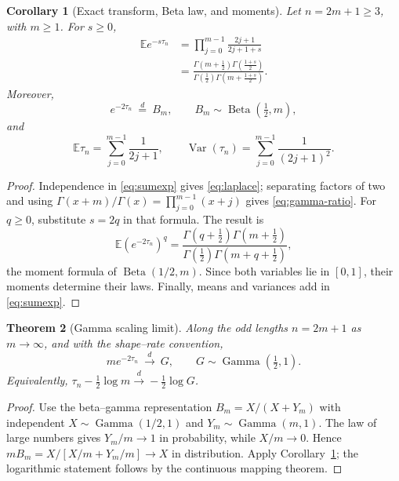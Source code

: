 \documentclass[10pt,a4paper]{amsart}
\newtheorem{theorem}{Theorem}[section]
\newtheorem{corollary}[theorem]{Corollary}
\theoremstyle{remark}
\newcommand{\Beta}{\operatorname{Beta}}
\newcommand{\Gam}{\operatorname{Gamma}}
\newcommand{\1}{\mathbf 1}
\begin{document}
\begin{corollary}[Exact transform, Beta law, and moments]\label{cor:beta}
Let $n=2m+1\geq3$, with $m\geq1$.  For $s\geq0$,
\begin{align}
 \mathbb E e^{-s\tau_n}
 &=\prod_{j=0}^{m-1}\frac{2j+1}{2j+1+s} \label{eq:laplace}\\
 &=\frac{\Gamma(m+\tfrac12)\Gamma(\tfrac{1+s}{2})}
 {\Gamma(\tfrac12)\Gamma(m+\tfrac{1+s}{2})}.       \label{eq:gamma-ratio}
\end{align}
Moreover,
\begin{equation}\label{eq:beta}
 e^{-2\tau_n}\ \stackrel d=\ B_m,\qquad
 B_m\sim\Beta\!\left(\tfrac12,m\right),
\end{equation}
and
\begin{equation}\label{eq:moments}
 \mathbb E\tau_n=\sum_{j=0}^{m-1}\frac1{2j+1},
 \qquad
 \operatorname{Var}(\tau_n)=\sum_{j=0}^{m-1}\frac1{(2j+1)^2}.
\end{equation}
\end{corollary}

\begin{proof}
Independence in \eqref{eq:sumexp} gives \eqref{eq:laplace}; separating factors
of two and using $\Gamma(x+m)/\Gamma(x)=\prod_{j=0}^{m-1}(x+j)$ gives
\eqref{eq:gamma-ratio}.  For $q\geq0$, substitute $s=2q$ in that formula.
The result is
\[
 \mathbb E(e^{-2\tau_n})^q
 =\frac{\Gamma(q+\tfrac12)\Gamma(m+\tfrac12)}
 {\Gamma(\tfrac12)\Gamma(m+q+\tfrac12)},
\]
the moment formula of $\Beta(1/2,m)$.  Since both variables lie in $[0,1]$,
their moments determine their laws.  Finally, means and variances add in
\eqref{eq:sumexp}.
\end{proof}

\begin{theorem}[Gamma scaling limit]\label{thm:gamma-limit}
Along the odd lengths $n=2m+1$ as $m\to\infty$, and with the shape--rate
convention,
\begin{equation}\label{eq:limit}
 m e^{-2\tau_n}\ \xrightarrow{d}\
 G,\qquad G\sim\Gam\!\left(\tfrac12,1\right).
\end{equation}
Equivalently,
$\tau_n-\tfrac12\log m\xrightarrow d-\tfrac12\log G$.
\end{theorem}

\begin{proof}
Use the beta--gamma representation
$B_m=X/(X+Y_m)$ with independent
$X\sim\Gam(1/2,1)$ and $Y_m\sim\Gam(m,1)$.  The law of large numbers gives
$Y_m/m\to1$ in probability, while $X/m\to0$.  Hence
$mB_m=X/[X/m+Y_m/m]\to X$ in distribution.  Apply
Corollary~\ref{cor:beta}; the logarithmic statement follows by the continuous
mapping theorem.
\end{proof}
\end{document}

